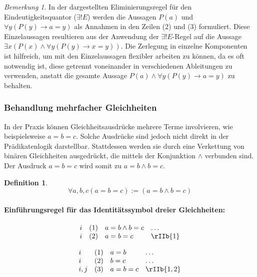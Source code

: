 \documentclass{book}
\theoremstyle{plain}
\theoremstyle{remark}
\newtheorem*{remark}{Bemerkung}
\theoremstyle{definition}
\newtheorem{definition}{Definition}[section]
\begin{document}
\begin{remark}
    In der dargestellten Eliminierungsregel für den Eindeutigkeitsquantor (\(\exists! E\)) werden die Aussagen \( P(a) \) und \( \forall y (P(y) \rightarrow a = y) \) als Annahmen in den Zeilen (2) und (3) formuliert. Diese Einzelaussagen resultieren aus der Anwendung der \(\exists! E\)-Regel auf die Aussage \( \exists x (P(x) \land \forall y (P(y) \rightarrow x = y)) \). Die Zerlegung in einzelne Komponenten ist hilfreich, um mit den Einzelaussagen flexibler arbeiten zu können, da es oft notwendig ist, diese getrennt voneinander in verschiedenen Ableitungen zu verwenden, anstatt die gesamte Aussage \( P(a) \land \forall y (P(y) \rightarrow a = y) \) zu behalten.
\end{remark}



\subsubsection{Behandlung mehrfacher Gleichheiten}
In der Praxis können Gleichheitsausdrücke mehrere Terme involvieren, wie beispielsweise \(a = b = c\). Solche Ausdrücke sind jedoch nicht direkt in der Prädikatenlogik darstellbar. Stattdessen werden sie durch eine Verkettung von binären Gleichheiten ausgedrückt, die mittels der Konjunktion \(\land\) verbunden sind. Der Ausdruck \(a = b = c\) wird somit zu \(a = b \land b = c\).

\begin{definition}
\[
\forall a, b, c \left( a = b = c \right) := \left( a = b \land b = c \right)
\]
\end{definition}

\paragraph{Einführungsregel für das Identitätssymbol dreier Gleichheiten:}
\label{rule:rIIb}

\[
\begin{array}{llll}
	i & (1) & a = b \land b = c & \dots \\
 	i & (2) & a = b = c & \rIIb{1} \\
\end{array}
\]

\[
\begin{array}{llll}
	i & (1) & a = b & \dots \\
        i & (2) & b = c & \dots \\
 	i,j & (3) & a = b = c & \rIIb{1,2} \\
\end{array}
\]
\end{document}
